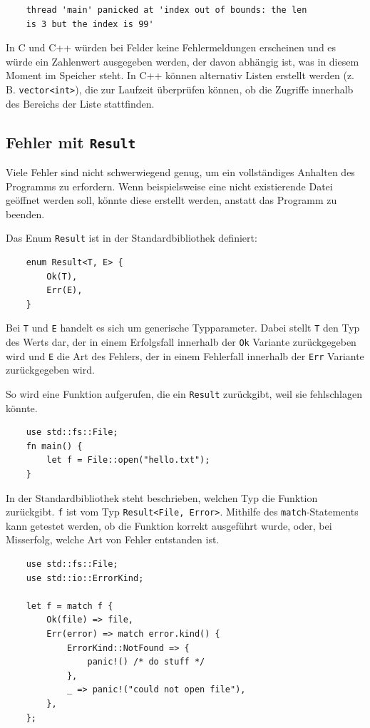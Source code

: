 \begin{lstlisting}
    thread 'main' panicked at 'index out of bounds: the len
    is 3 but the index is 99'
\end{lstlisting}

In C und C++ würden bei Felder keine Fehlermeldungen erscheinen und es würde ein Zahlenwert ausgegeben werden, der davon abhängig ist, was in diesem Moment im Speicher steht. In C++ können alternativ Listen erstellt werden (z. B. \verb"vector<int>"), die zur Laufzeit überprüfen können, ob die Zugriffe innerhalb des Bereichs der Liste stattfinden.

\subsection{Fehler mit \texttt{Result}}

Viele Fehler sind nicht schwerwiegend genug, um ein vollständiges Anhalten des Programms zu erfordern. Wenn beispielsweise eine nicht existierende Datei geöffnet werden soll, könnte diese erstellt werden, anstatt das Programm zu beenden.

Das Enum \verb"Result" ist in der Standardbibliothek definiert:

\begin{lstlisting}
    enum Result<T, E> {
        Ok(T),
        Err(E),
    }
\end{lstlisting}

Bei \verb"T" und \verb"E" handelt es sich um generische Typparameter. Dabei stellt \verb"T" den Typ des Werts dar, der in einem Erfolgsfall innerhalb der \verb"Ok" Variante zurückgegeben wird und \verb"E" die Art des Fehlers, der in einem Fehlerfall innerhalb der \verb"Err" Variante zurückgegeben wird.

So wird eine Funktion aufgerufen, die ein \verb"Result" zurückgibt, weil sie fehlschlagen könnte.

\begin{lstlisting}
    use std::fs::File;
    fn main() {
        let f = File::open("hello.txt");
    }
\end{lstlisting}

In der Standardbibliothek steht beschrieben, welchen Typ die Funktion zu\-rück\-gibt. \verb"f" ist vom Typ \verb"Result<File, Error>". Mithilfe des \verb"match"-Statements kann getestet werden, ob die Funktion korrekt ausgeführt wurde, oder, bei Misserfolg, welche Art von Fehler entstanden ist.

\begin{lstlisting}
    use std::fs::File;
    use std::io::ErrorKind;

    let f = match f {
        Ok(file) => file,
        Err(error) => match error.kind() {
            ErrorKind::NotFound => {
                panic!() /* do stuff */
            },
            _ => panic!("could not open file"),
        },
    };
\end{lstlisting}

